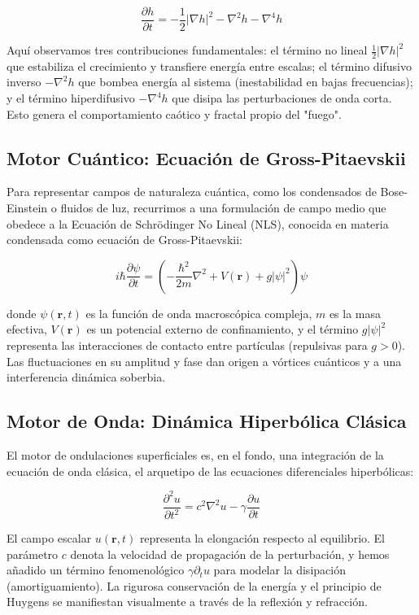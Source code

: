 \documentclass[12pt]{article}
\begin{document}
\begin{equation}
\frac{\partial h}{\partial t} = -\frac{1}{2} |\nabla h|^2 - \nabla^2 h - \nabla^4 h
\end{equation}

Aquí observamos tres contribuciones fundamentales: el término no lineal $\frac{1}{2} |\nabla h|^2$ que estabiliza el crecimiento y transfiere energía entre escalas; el término difusivo inverso $-\nabla^2 h$ que bombea energía al sistema (inestabilidad en bajas frecuencias); y el término hiperdifusivo $-\nabla^4 h$ que disipa las perturbaciones de onda corta. Esto genera el comportamiento caótico y fractal propio del "fuego".

\subsection{Motor Cuántico: Ecuación de Gross-Pitaevskii}
Para representar campos de naturaleza cuántica, como los condensados de Bose-Einstein o fluidos de luz, recurrimos a una formulación de campo medio que obedece a la Ecuación de Schrödinger No Lineal (NLS), conocida en materia condensada como ecuación de Gross-Pitaevskii:

\begin{equation}
i \hbar \frac{\partial \psi}{\partial t} = \left( -\frac{\hbar^2}{2m} \nabla^2 + V(\mathbf{r}) + g |\psi|^2 \right) \psi
\end{equation}

donde $\psi(\mathbf{r},t)$ es la función de onda macroscópica compleja, $m$ es la masa efectiva, $V(\mathbf{r})$ es un potencial externo de confinamiento, y el término $g |\psi|^2$ representa las interacciones de contacto entre partículas (repulsivas para $g > 0$). Las fluctuaciones en su amplitud y fase dan origen a vórtices cuánticos y a una interferencia dinámica soberbia.

\subsection{Motor de Onda: Dinámica Hiperbólica Clásica}
El motor de ondulaciones superficiales es, en el fondo, una integración de la ecuación de onda clásica, el arquetipo de las ecuaciones diferenciales hiperbólicas:

\begin{equation}
\frac{\partial^2 u}{\partial t^2} = c^2 \nabla^2 u - \gamma \frac{\partial u}{\partial t}
\end{equation}

El campo escalar $u(\mathbf{r},t)$ representa la elongación respecto al equilibrio. El parámetro $c$ denota la velocidad de propagación de la perturbación, y hemos añadido un término fenomenológico $\gamma \partial_t u$ para modelar la disipación (amortiguamiento). La rigurosa conservación de la energía y el principio de Huygens se manifiestan visualmente a través de la reflexión y refracción.
\end{document}
